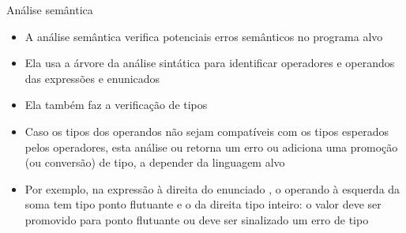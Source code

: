 \begin{frame}[fragile]{Análise semântica}

    \begin{itemize}
        \item A análise semântica verifica potenciais erros semânticos no programa alvo

        \item Ela usa a árvore da análise sintática para identificar operadores e operandos das expressões e enunicados

        \item Ela também faz a verificação de tipos

        \item Caso os tipos dos operandos não sejam compatíveis com os tipos esperados pelos operadores, esta análise ou retorna um erro ou adiciona uma
        promoção (ou conversão) de tipo, a depender da linguagem alvo

        \item Por exemplo, na expressão à direita do enunciado , o operando à esquerda da soma tem tipo ponto flutuante e o da direita
            tipo inteiro: o valor  deve ser promovido para ponto flutuante ou deve ser sinalizado um erro de tipo
    \end{itemize}

\end{frame}

